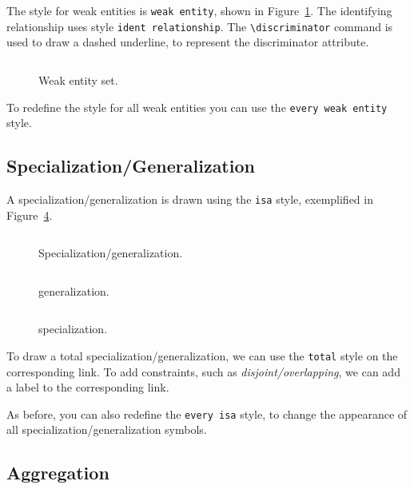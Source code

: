 \documentclass[12pt]{article}
\newcommand{\demo}[1]{
  \bigskip
  \begin{minipage}{\linewidth}
      \begin{center}
          
      \end{center}
      \begin{center}
          \scriptsize
          \inputminted{latex}{snippets/#1.tex}
      \end{center}
  \end{minipage}
}
\begin{document}
The style for weak entities is \texttt{weak entity}, shown in
Figure~\ref{fig:weak}. The identifying relationship uses style
\texttt{ident relationship}. The \verb+\discriminator+ command is used to
draw a dashed underline, to represent the discriminator attribute.

\begin{figure}[htb!]
    \centering
    \demo{weak}
    \caption{Weak entity set.}
\label{fig:weak}
\end{figure}

To redefine the style for all weak entities you can use the \texttt{every weak
  entity} style.

%

\subsection{Specialization/Generalization}
\label{sec:spec}

A specialization/generalization is drawn using the \texttt{isa} style,
exemplified in Figure~\ref{fig:isa}.

\begin{figure}[htb!]
    \centering
    \demo{isa}
    \caption{Specialization/generalization.}
\label{fig:isa}
\end{figure}

\begin{figure}[htb!]
    \centering
    \demo{generalization}
    \caption{generalization.}
\label{fig:isa}
\end{figure}


\begin{figure}[htb!]
    \centering
    \demo{specialization}
    \caption{specialization.}
\label{fig:isa}
\end{figure}

To draw a total specialization/generalization, we can use the \texttt{total}
style on the corresponding link.  To add constraints, such as
\emph{disjoint/overlapping}, we can add a label to the corresponding link.

As before, you can also redefine the \texttt{every isa} style, to change the
appearance of all specialization/generalization symbols.

\subsection{Aggregation}
\label{sec:aggregation}
\end{document}
